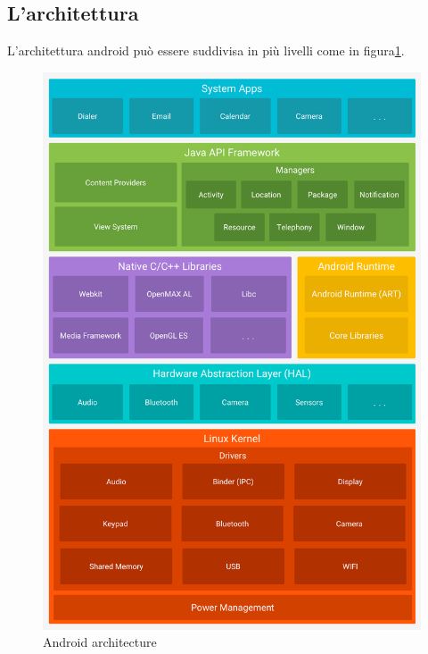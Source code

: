 \subsection{L'architettura}
L'architettura android può essere suddivisa in più livelli come in figura\ref{fig:andoridStack}. 
\begin{figure}[h]
\centering 
\includegraphics[width=0.4\linewidth]{imgs/capitolo2/os/android-stack_2x.png}
\caption{Android architecture} 
\label{fig:andoridStack} 
\end{figure}

